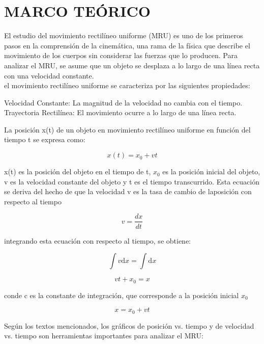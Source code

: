 \documentclass[journal]{IEEEtran}
\begin{document}
\section{MARCO TEÓRICO}
El estudio del movimiento rectilíneo uniforme (MRU) es uno de los primeros pasos en la comprensión de la cinemática, una rama de la física que describe el movimiento de los cuerpos sin considerar las fuerzas que lo producen. Para analizar el MRU, se asume que un objeto se desplaza a lo largo de una línea recta con una velocidad constante.\\
el movimiento rectilíneo uniforme se caracteriza por las siguientes propiedades:

Velocidad Constante: La magnitud de la velocidad no cambia con el tiempo.
Trayectoria Rectilínea: El movimiento ocurre a lo largo de una línea recta.

La posición x(t) de un objeto en movimiento rectilíneo uniforme en función del tiempo t se expresa como:

\begin{equation}\label{eq:1}
 x(t) = x_0 + vt
\end{equation}

x(t) es la posición del objeto en el tiempo de t, \(x_0\) es la posición inicial del objeto, v es la velocidad constante del objeto
y t es el tiempo transcurrido.
Esta ecuación se deriva del hecho de que la velocidad v es la tasa de cambio de laposición con respecto al tiempo

\begin{equation}\label{eq:3}
 v = \frac{dx}{dt}
\end{equation}

integrando esta ecuación con respecto al tiempo, se obtiene:

\begin{equation}\label{eq:4}
\int v \mathrm{d}x = \int \mathrm{d}x
\end{equation}

\begin{equation}\label{eq:4}
vt + x_0 = x
\end{equation}

conde c es la constante de integración, que corresponde a la posición inicial \(x_0\)

\begin{equation}\label{eq:4}
x = x_0 + vt
\end{equation}

Según los textos mencionados, los gráficos de posición vs. tiempo y de velocidad vs. tiempo son herramientas importantes para analizar el MRU:
\end{document}
